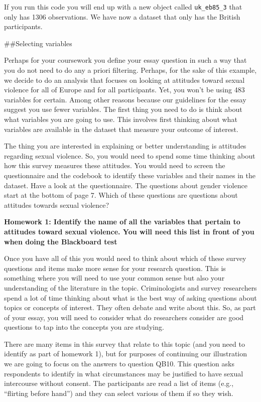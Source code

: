 \documentclass[]{book}
\theoremstyle{definition}
\theoremstyle{definition}
\theoremstyle{definition}
\theoremstyle{remark}
\begin{document}
If you run this code you will end up with a new object called
\texttt{uk\_eb85\_3} that only has 1306 observations. We have now a
dataset that only has the British participants.

\#\#Selecting variables

Perhaps for your coursework you define your essay question in such a way
that you do not need to do any a priori filtering. Perhaps, for the sake
of this example, we decide to do an analysis that focuses on looking at
attitudes toward sexual violence for all of Europe and for all
participants. Yet, you won't be using 483 variables for certain. Among
other reasons because our guidelines for the essay suggest you use fewer
variables. The first thing you need to do is think about what variables
you are going to use. This involves first thinking about what variables
are available in the dataset that measure your outcome of interest.

The thing you are interested in explaining or better understanding is
attitudes regarding sexual violence. So, you would need to spend some
time thinking about how this survey measures these attitudes. You would
need to screen the questionnaire and the codebook to identify these
variables and their names in the dataset. Have a look at the
questionnaire. The questions about gender violence start at the bottom
of page 7. Which of these questions are questions about attitudes
towards sexual violence?

\textbf{Homework 1: Identify the name of all the variables that pertain
to attitudes toward sexual violence. You will need this list in front of
you when doing the Blackboard test}

Once you have all of this you would need to think about which of these
survey questions and items make more sense for your research question.
This is something where you will need to use your common sense but also
your understanding of the literature in the topic. Criminologists and
survey researchers spend a lot of time thinking about what is the best
way of asking questions about topics or concepts of interest. They often
debate and write about this. So, as part of your essay, you will need to
consider what do researchers consider are good questions to tap into the
concepts you are studying.

There are many items in this survey that relate to this topic (and you
need to identify as part of homework 1), but for purposes of continuing
our illustration we are going to focus on the answers to question QB10.
This question asks respondents to identify in what circumstances may be
justified to have sexual intercourse without consent. The participants
are read a list of items (e.g., ``flirting before hand'') and they can
select various of them if so they wish.
\end{document}
